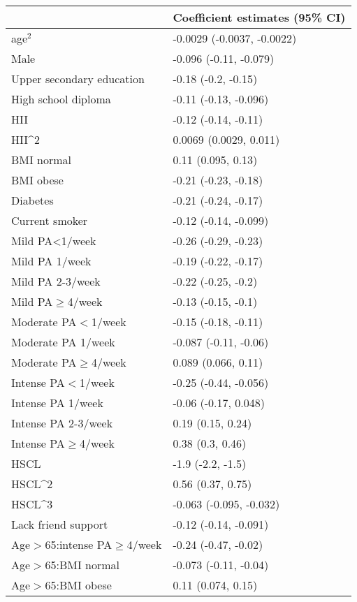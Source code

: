 \begin{tabular}{ll}
& Coefficient estimates (95\% CI) \\ 
\hline 
age$^2$ & -0.0029 (-0.0037, -0.0022) \\ 
Male & -0.096 (-0.11, -0.079) \\ 
Upper secondary education & -0.18 (-0.2, -0.15) \\ 
High school diploma & -0.11 (-0.13, -0.096) \\ 
HII & -0.12 (-0.14, -0.11) \\ 
HII^2 & 0.0069 (0.0029, 0.011) \\ 
BMI normal & 0.11 (0.095, 0.13) \\ 
BMI obese & -0.21 (-0.23, -0.18) \\ 
Diabetes & -0.21 (-0.24, -0.17) \\ 
Current smoker & -0.12 (-0.14, -0.099) \\ 
Mild PA<1/week & -0.26 (-0.29, -0.23) \\ 
Mild PA 1/week & -0.19 (-0.22, -0.17) \\ 
Mild PA 2-3/week & -0.22 (-0.25, -0.2) \\ 
Mild PA$\geq$4/week & -0.13 (-0.15, -0.1) \\ 
Moderate PA$<$1/week & -0.15 (-0.18, -0.11) \\ 
Moderate PA 1/week & -0.087 (-0.11, -0.06) \\ 
Moderate PA$\geq$4/week & 0.089 (0.066, 0.11) \\ 
Intense PA$<$1/week & -0.25 (-0.44, -0.056) \\ 
Intense PA 1/week & -0.06 (-0.17, 0.048) \\ 
Intense PA 2-3/week & 0.19 (0.15, 0.24) \\ 
Intense PA$\geq$4/week & 0.38 (0.3, 0.46) \\ 
HSCL & -1.9 (-2.2, -1.5) \\ 
HSCL^2 & 0.56 (0.37, 0.75) \\ 
HSCL^3 & -0.063 (-0.095, -0.032) \\ 
Lack friend support & -0.12 (-0.14, -0.091) \\ 
Age$>$65:intense PA$\geq$4/week & -0.24 (-0.47, -0.02) \\ 
Age$>$65:BMI normal & -0.073 (-0.11, -0.04) \\ 
Age$>$65:BMI obese & 0.11 (0.074, 0.15) \\ 
\hline 
\end{tabular}